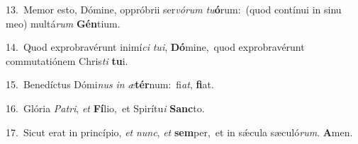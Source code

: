 {\numbfont\textcolor{\numbcolor}{13.}}~Memor esto, Dómine, oppróbrii ser\-\textit{vó}\-\textit{rum} \textit{tu}\-\textbf{ó}rum:~\star (quod contínui in sinu meo) multá\textit{rum} \textbf{Gén}\-tium.\par
{\numbfont\textcolor{\numbcolor}{14.}}~Quod exprobravérunt inimí\textit{ci} \textit{tu}\-\textit{i}, \textbf{Dó}\-mine,~\star quod exprobravérunt commutatiónem Chris\textit{ti} \textbf{tu}\-i.\par
{\numbfont\textcolor{\numbcolor}{15.}}~Benedíctus Dómi\textit{nus} \textit{in} \textit{æ}\-\textbf{tér}num:~\star fi\-\textit{at}\-, \textbf{fi}\-at.\par
{\numbfont\textcolor{\numbcolor}{16.}}~Glória \textit{Pa}\-\textit{tri}, \textit{et} \textbf{Fí}\-lio,~\star et Spirítu\textit{i} \textbf{Sanc}\-to.\par
{\numbfont\textcolor{\numbcolor}{17.}}~Sicut erat in princípio, \textit{et} \textit{nunc}\-, \textit{et} \textbf{sem}\-per,~\star et in sǽcula sæculó\-\textit{rum}\-. \textbf{A}\-men.\par
